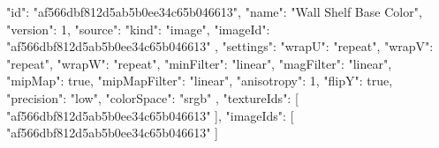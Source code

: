 {
  "id": "af566dbf812d5ab5b0ee34c65b046613",
  "name": "Wall Shelf Base Color",
  "version": 1,
  "source": {
    "kind": "image",
    "imageId": "af566dbf812d5ab5b0ee34c65b046613"
  },
  "settings": {
    "wrapU": "repeat",
    "wrapV": "repeat",
    "wrapW": "repeat",
    "minFilter": "linear",
    "magFilter": "linear",
    "mipMap": true,
    "mipMapFilter": "linear",
    "anisotropy": 1,
    "flipY": true,
    "precision": "low",
    "colorSpace": "srgb"
  },
  "textureIds": [
    "af566dbf812d5ab5b0ee34c65b046613"
  ],
  "imageIds": [
    "af566dbf812d5ab5b0ee34c65b046613"
  ]
}
